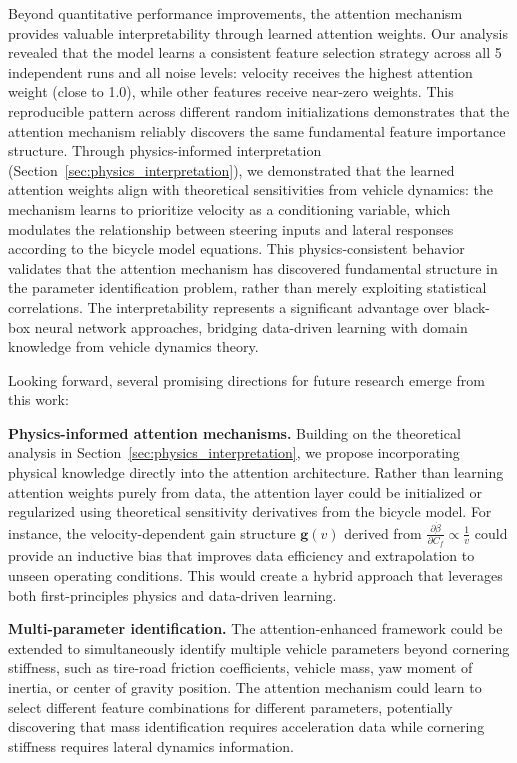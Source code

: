 \documentclass[Afour,sageh,times]{sagej}
\begin{document}
Beyond quantitative performance improvements, the attention mechanism provides valuable interpretability through learned attention weights. Our analysis revealed that the model learns a consistent feature selection strategy across all 5 independent runs and all noise levels: velocity receives the highest attention weight (close to 1.0), while other features receive near-zero weights. This reproducible pattern across different random initializations demonstrates that the attention mechanism reliably discovers the same fundamental feature importance structure. Through physics-informed interpretation (Section~\ref{sec:physics_interpretation}), we demonstrated that the learned attention weights align with theoretical sensitivities from vehicle dynamics: the mechanism learns to prioritize velocity as a conditioning variable, which modulates the relationship between steering inputs and lateral responses according to the bicycle model equations. This physics-consistent behavior validates that the attention mechanism has discovered fundamental structure in the parameter identification problem, rather than merely exploiting statistical correlations. The interpretability represents a significant advantage over black-box neural network approaches, bridging data-driven learning with domain knowledge from vehicle dynamics theory.

Looking forward, several promising directions for future research emerge from this work:

\textbf{Physics-informed attention mechanisms.} Building on the theoretical analysis in Section~\ref{sec:physics_interpretation}, we propose incorporating physical knowledge directly into the attention architecture. Rather than learning attention weights purely from data, the attention layer could be initialized or regularized using theoretical sensitivity derivatives from the bicycle model. For instance, the velocity-dependent gain structure $\mathbf{g}(v)$ derived from $\frac{\partial \dot{\beta}}{\partial C_f} \propto \frac{1}{v}$ could provide an inductive bias that improves data efficiency and extrapolation to unseen operating conditions. This would create a hybrid approach that leverages both first-principles physics and data-driven learning.

\textbf{Multi-parameter identification.} The attention-enhanced framework could be extended to simultaneously identify multiple vehicle parameters beyond cornering stiffness, such as tire-road friction coefficients, vehicle mass, yaw moment of inertia, or center of gravity position. The attention mechanism could learn to select different feature combinations for different parameters, potentially discovering that mass identification requires acceleration data while cornering stiffness requires lateral dynamics information.
\end{document}
